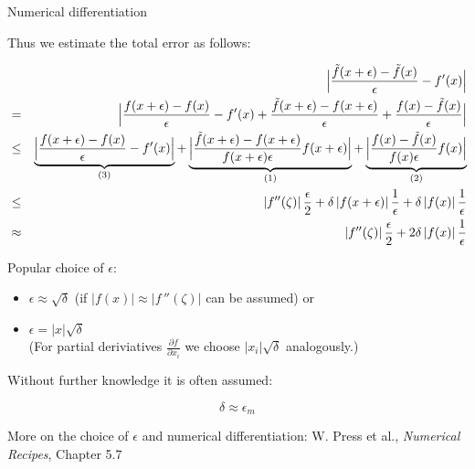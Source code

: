 \documentclass[11pt,compress,t,notes=noshow, xcolor=table]{beamer}
\begin{document}
\begin{vbframe}{Numerical differentiation}
\begin{footnotesize}
  Thus we estimate the total error as follows:
  
  \begin{eqnarray*}
  && \Bigl|\frac{\tilde f(x+\epsilon) - \tilde f(x)}{\epsilon} - f\!\,'(x) \Bigr| \\ &=&  \Bigl|\frac{f(x+\epsilon) - f(x)}{\epsilon} - f'(x) + \frac{\tilde f(x+\epsilon) - f(x + \epsilon)}{\epsilon} + \frac{f(x) - \tilde f(x)}{\epsilon}\Bigr| \\
  &\le&  \underbrace{\Bigl|\frac{f(x+\epsilon) - f(x)}{\epsilon} - f'(x)\Bigr|}_{(3)} + \underbrace{\Bigl|\frac{\tilde f(x+\epsilon) - f(x + \epsilon)}{f(x + \epsilon)\epsilon} f(x + \epsilon)\Bigr|}_{(1)} + \underbrace{\Bigl|\frac{f(x) - \tilde f(x)}{f(x)\epsilon} f(x)\Bigr|}_{(2)} \\
  &\le& \left| f\!\,''(\zeta)\right|\frac{\epsilon}{2} + \delta\left| f(x + \epsilon) \right|\frac 1\epsilon + \delta\left| f(x) \right|\frac 1\epsilon \\
  &\approx& \left| f\!\,''(\zeta)\right|\frac{\epsilon}{2} + 2 \delta\left| f(x)
  \right|\frac 1\epsilon \\
  \end{eqnarray*}
  
  \end{footnotesize}
  
  \framebreak
  
  Popular choice of $\epsilon$:
  
  \begin{itemize}
  \item $\epsilon \approx \sqrt{\delta}$ (if $\left|f(x)\right| \approx \left|
  f\!\,''(\zeta)\right|$ can be assumed) or
  \item $\epsilon = \left|x\right|\sqrt{\delta}$ \\
  (For partial deriviatives $\frac{\partial f}{\partial x_i}$ we choose 
  $\left|x_i\right|\sqrt{\delta}$ analogously.)
  \end{itemize}
  
  
  Without further knowledge it is often assumed:
  
  $$
  \delta \approx \epsilon_m
  $$
  
  \lz
  
  \begin{footnotesize}
  More on the choice of $\epsilon$ and numerical differentiation: W. Press et al., \emph{Numerical Recipes}, Chapter 5.7
  \end{footnotesize}
  
  

\end{vbframe}
\end{document}
